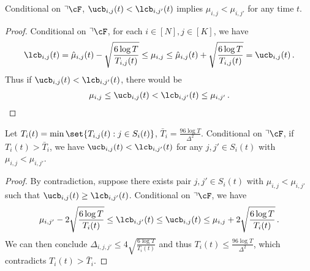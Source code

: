 \begin{lemma}\label{lem:cen:ucblcb}
Conditional on $\urcorner \cF$, $\ucb_{i,j}(t)<\lcb_{i,j'}(t)$ implies $\mu_{i,j}<\mu_{i,j'}$ for any time $t$. 
\end{lemma}

\begin{proof}
Conditional on $\urcorner \cF$, for each $i\in[N],j\in[K]$, we have
\begin{align*}
 \lcb_{i,j}(t) =\hat{\mu}_{i,j}(t)-\sqrt{\frac{6\log T}{ T_{i,j}(t)}}  \le \mu_{i,j} \le \hat{\mu}_{i,j}(t)+\sqrt{\frac{6\log T}{ T_{i,j}(t)}} = \ucb_{i,j}(t)\,.
\end{align*}
Thus if $\ucb_{i,j}(t)<\lcb_{i,j'}(t)$, there would be 
\begin{align*}
  \mu_{i,j} \le  \ucb_{i,j}(t) <\lcb_{i,j'}(t) \le \mu_{i,j'}\,.
\end{align*}
\end{proof}









\begin{lemma}\label{lem:cen:pulltime}
Let $T_i(t) = \min\set{T_{i,j}(t): j \in S_i(t)}$, $\bar{T}_i = \frac{96\log T}{\Delta^2}$. Conditional on $\urcorner \cF$, if $T_i(t) > \bar{T}_i$, we have $\ucb_{i,j}(t)< \lcb_{i,j'}(t)$ for any $j,j'\in S_{i}(t)$ with $\mu_{i,j}<\mu_{i,j'}$. 
\end{lemma} 

\begin{proof}
By contradiction, suppose there exists pair $j,j' \in S_{i}(t)$ with $\mu_{i,j}<\mu_{i,j'}$ such that $\ucb_{i,j}(t)\ge \lcb_{i,j'}(t)$. Conditional on $\urcorner \cF$, we have 
\begin{align*}
 \mu_{i,j'}- 2\sqrt{\frac{6\log T}{{T}_{i}(t)}} \le \lcb_{i,j'}(t) \le \ucb_{i,j}(t) \le \mu_{i,j}+2\sqrt{\frac{6\log T}{{T}_{i}(t)}} \,.
\end{align*}
We can then conclude $\Delta_{i,j,j'} \le 4 \sqrt{\frac{6\log T}{{T}_{i}(t)}}$ and thus ${T}_{i}(t) \le \frac{96 \log T}{\Delta^2}$, which contradicts $T_i(t) > \bar{T}_i$. 
\end{proof}



